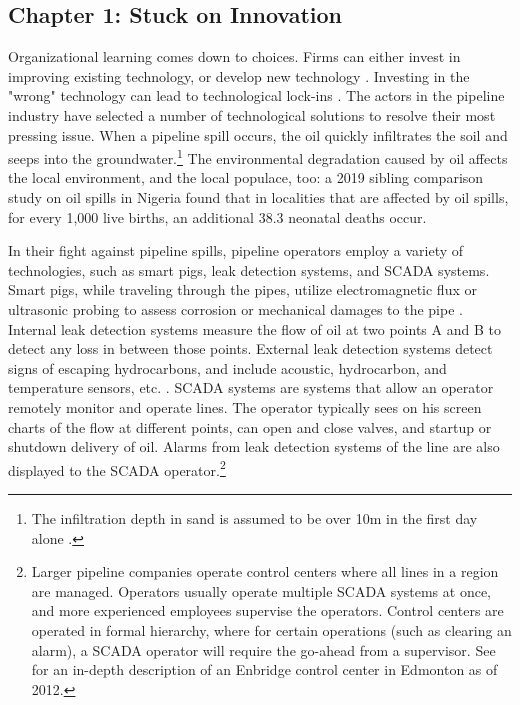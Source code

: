 \subsection{Chapter 1: Stuck on Innovation}

	Organizational learning comes down to choices. Firms can either invest in improving existing technology, or develop new technology \citep{March1991}. Investing in the "wrong" technology can lead to technological lock-ins \citep{Levinthal1993}. The actors in the pipeline industry have selected a number of technological solutions to resolve their most pressing issue. When a pipeline spill occurs, the oil quickly infiltrates the soil and seeps into the groundwater.\footnote{The infiltration depth in sand is assumed to be over 10m in the first day alone \citep{Bonvicini2015}.} The environmental degradation caused by oil affects the local environment, and the local populace, too: a 2019 sibling comparison study on oil spills in Nigeria found that in localities that are affected by oil spills, for every 1,000 live births, an additional 38.3 neonatal deaths occur\citep{Bruederle2019}. %

In their fight against pipeline spills, pipeline operators employ a variety of technologies, such as smart pigs, leak detection systems, and SCADA systems. Smart pigs, while traveling through the pipes, utilize electromagnetic flux or ultrasonic probing to assess corrosion or mechanical damages to the pipe \citep{Singh2017-7}. Internal leak detection systems measure the flow of oil at two points A and B to detect any loss in between those points. External leak detection systems detect signs of escaping hydrocarbons, and include acoustic, hydrocarbon, and temperature sensors, etc. \citep{Shaw2012}. SCADA systems are systems that allow an operator remotely monitor and operate lines. The operator typically sees on his screen charts of the flow at different points, can open and close valves, and startup or shutdown delivery of oil. Alarms from leak detection systems of the line are also displayed to the SCADA operator.\footnote{Larger pipeline companies operate control centers where all lines in a region are managed. Operators usually operate multiple SCADA systems at once, and more experienced employees supervise the operators. Control centers are operated in formal hierarchy, where for certain operations (such as clearing an alarm), a SCADA operator will require the go-ahead from a supervisor. See \citet{NTSB2012} for an in-depth description of an Enbridge control center in Edmonton as of 2012.}

